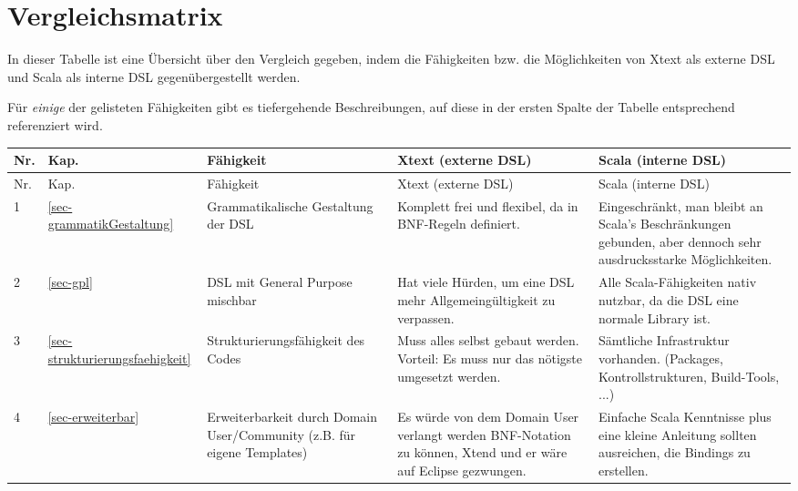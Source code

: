 \section{Vergleichsmatrix}\label{sec-vergleichsmatrix}

In dieser Tabelle ist eine Übersicht über den Vergleich gegeben, indem
die Fähigkeiten bzw. die Möglichkeiten von Xtext als externe DSL und
Scala als interne DSL gegenübergestellt werden.

Für \emph{einige} der gelisteten Fähigkeiten gibt es
tiefergehende Beschreibungen, auf diese
in der ersten Spalte der Tabelle entsprechend referenziert wird.

\begin{landscape}
\begin{longtable}{|p{0.5cm}|p{0.8cm}|p{4.3cm}|p{6.3cm}|p{6.3cm}|}

  \hline
  Nr. & Kap. & Fähigkeit & Xtext (externe DSL) & Scala (interne DSL) \\ \hline \hline
  \endfirsthead

  \hline
  Nr. & Kap. & Fähigkeit & Xtext (externe DSL) & Scala (interne DSL) \\ \hline
  \endhead

  1
  & \ref{sec-grammatikGestaltung}
  & Grammatikalische Gestaltung der DSL
  & {\small Komplett frei und flexibel, da in BNF-Regeln definiert.}
  & {\small Eingeschränkt, man bleibt an Scala's Beschränkungen gebunden, aber
    dennoch sehr ausdrucksstarke Möglichkeiten.}
  \\\hline

  2
  & \ref{sec-gpl}
  & DSL mit General Purpose mischbar
  & {\small Hat viele Hürden, um eine DSL mehr Allgemeingültigkeit zu verpassen.}
  & {\small Alle Scala-Fähigkeiten nativ nutzbar, da die DSL eine normale Library ist.}
  \\\hline

  3
  & \ref{sec-strukturierungsfaehigkeit}
  & Strukturierungsfähigkeit des Codes
  & {\small Muss alles selbst gebaut werden. Vorteil: Es muss nur das nötigste
    umgesetzt werden.}
  & {\small Sämtliche Infrastruktur vorhanden. (Packages, Kontrollstrukturen,
    Build-Tools, ...)}
  \\\hline

  4
  & \ref{sec-erweiterbar}
  & Erweiterbarkeit durch Domain User/Community (z.B. für eigene Templates)
  & {\small Es würde von dem Domain User verlangt werden BNF-Notation zu können,
    Xtend und er wäre auf Eclipse gezwungen.}
  & {\small Einfache Scala Kenntnisse plus eine kleine Anleitung sollten ausreichen,
    die Bindings zu erstellen.}
  \\\hline


\end{longtable}
\end{landscape}

